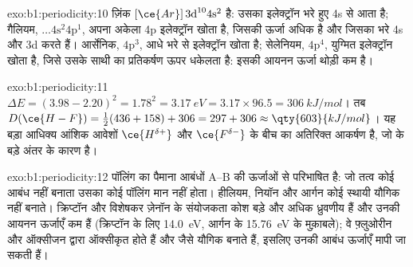 \begin{solution}{exo:b1:periodicity:10}
ज़िंक $[\ce{Ar}]\,3\text{d}^{10} 4\text{s}^2$ है: उसका इलेक्ट्रॉन भरे हुए
4s से आता है; गैलियम, $\dots 4\text{s}^2 4\text{p}^1$, अपना अकेला 4p
इलेक्ट्रॉन खोता है, जिसकी ऊर्जा अधिक है और जिसका  भरे 4s और 3d करते हैं। आर्सेनिक,
$4\text{p}^3$, आधे भरे  से इलेक्ट्रॉन खोता है; सेलेनियम,
$4\text{p}^4$, युग्मित इलेक्ट्रॉन खोता है, जिसे उसके साथी का प्रतिकर्षण ऊपर धकेलता
है: इसकी आयनन ऊर्जा थोड़ी कम है।
\end{solution}

\begin{solution}{exo:b1:periodicity:11}
$\Delta E = (3.98 - 2.20)^2 = 1.78^2 = \qty{3.17}{eV} = 3.17 \times 96.5 =
\qty{306}{kJ/mol}$। तब $D(\ce{H-F}) = \tfrac12(436 + 158) + 306 = 297 +
306 \approx \qty{603}{kJ/mol}$। यह बड़ा आधिक्य आंशिक आवेशों
$\ce{H^{\delta+}}$ और $\ce{F^{\delta-}}$ के बीच का अतिरिक्त आकर्षण है, जो
 के बड़े अंतर के कारण है।
\end{solution}

\begin{solution}{exo:b1:periodicity:12}
पॉलिंग का पैमाना आबंधों A--B की ऊर्जाओं से परिभाषित है: जो तत्व
कोई आबंध नहीं बनाता उसका कोई पॉलिंग मान नहीं होता। हीलियम, नियॉन और आर्गन कोई
स्थायी यौगिक नहीं बनाते। क्रिप्टॉन और विशेषकर ज़ेनॉन के संयोजकता कोश बड़े और अधिक
ध्रुवणीय हैं और उनकी आयनन ऊर्जाएँ कम हैं
(क्रिप्टॉन के लिए \qty{14.0}{eV}, आर्गन के \qty{15.76}{eV} के मुक़ाबले); वे
फ़्लुओरीन और ऑक्सीजन द्वारा ऑक्सीकृत होते हैं और  जैसे यौगिक बनाते हैं, इसलिए
उनकी आबंध ऊर्जाएँ मापी जा सकती हैं।
\end{solution}

